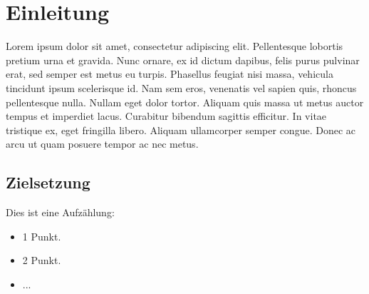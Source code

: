 \clearpage
\section{Einleitung}

Lorem ipsum dolor sit amet, consectetur adipiscing elit. Pellentesque lobortis pretium urna et gravida. Nunc ornare, 
ex id dictum dapibus, felis purus pulvinar erat, sed semper est metus eu turpis. Phasellus feugiat nisi massa, vehicula 
tincidunt ipsum scelerisque id. Nam sem eros, venenatis vel sapien quis, rhoncus pellentesque nulla. Nullam eget dolor
 tortor. Aliquam quis massa ut metus auctor tempus et imperdiet lacus. Curabitur bibendum sagittis efficitur. In vitae 
 tristique ex, eget fringilla libero. Aliquam ullamcorper semper congue. Donec ac arcu ut quam posuere tempor ac nec metus.

\subsection{Zielsetzung}
Dies ist eine Aufzählung:
\begin{itemize}
    \item 1 Punkt.
    \item 2 Punkt.
    \item ...
\end{itemize}
